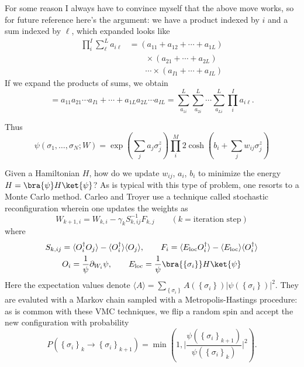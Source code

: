 \documentclass{article}
\begin{document}
\begin{thinnamedbox}[Note]
For some reason I always have to convince myself that the above move works, 
so for future reference here's the argument: we have a product indexed by 
$ i $ and a sum indexed by $ \ell $, which expanded looks like
\begin{align*}
	\prod_i^I \sum_\ell^L a_{i\ell}
		&= (a_{11} + a_{12} + \cdots + a_{1L})\\[-1em]
		&\qquad \times (a_{21} + \cdots + a_{2L})\\
		&\qquad \cdots \times (a_{I1} + \cdots + a_{IL})
\end{align*}
If we expand the products of sums, we obtain 
\begin{equation*}
	= a_{11} a_{21}\cdots a_{I1} + \cdots + a_{1L} a_{2L} \cdots a_{IL}
	= \sum_{a_{1i}}^L
	 \sum_{a_{2i}}^L \cdots
	 \sum_{a_{Li}}^L 
	 \prod_i^I a_{i\ell}.
\end{equation*}

\end{thinnamedbox}

Thus 
\begin{equation*}
	\psi(\sigma_1, \dots, \sigma_N; W)
	= 
	\exp\left(\sum_j a_j \sigma_j^z \right)
	\prod_i^M 2\cosh\left(b_i +\sum_{j} w_{ij} \sigma_j^z\right)
\end{equation*}

Given a Hamiltonian $ H $, how do we update $ w_{ij} $, $ a_i $, $ b_i $
to minimize the energy $ H = \bra{\psi}H\ket{\psi} $? As is typical with 
this type of problem, one resorts to a Monte Carlo method. Carleo and Troyer 
use a technique called stochastic reconfiguration wherein one updates the 
weights as 
\begin{equation*}
	W_{k+1, i}= W_{k,i} - \gamma_k S^{-1}_{k, ij} F_{k, j}
	\qquad (k=\text{iteration step})
\end{equation*}
where 
\begin{gather*}
	S_{k,ij} = \langle O_i^\dagger O_j\rangle - \langle O_i^\dagger\rangle \langle O_j\rangle,\qquad 
	F_{i} = \langle E_{\text{loc}} O_i^\dagger\rangle - \langle E_{\text{loc}}\rangle
		\langle O_i^\dagger \rangle\\
	O_i = \frac{1}{\psi} \partial_{W_i} \psi,\qquad 
	E_{\text{loc}} = \frac{1}{\psi}\bra{\left\{\sigma_i\right\}} H \ket{\psi} 
\end{gather*}
Here the expectation values denote $ \langle A\rangle = \sum_{\left\{\sigma_i\right\}} 
A (\left\{\sigma_i\right\})|\psi(\left\{\sigma_i\right\})|^2 $. They are 
evaluted with a Markov chain sampled with a Metropolis-Hastings procedure:
as is common with these VMC techniques, we flip a random spin and accept the 
new configuration with probability 
\begin{equation*}
	P(\left\{\sigma_i\right\}_k \to \left\{\sigma_i\right\}_{k+1})
		= \min \left(1, \Bigg| \frac{
				\psi(\left\{\sigma_i\right\}_{k+1})
			}{
				\psi(\left\{\sigma_i\right\}_{k})}\Bigg|^2\right).
\end{equation*}
\end{document}

